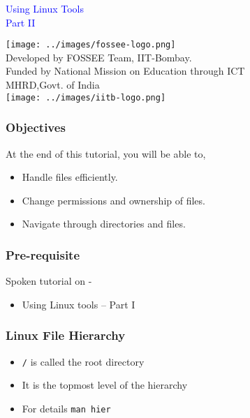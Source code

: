 \documentclass[12pt,compress]{beamer}
\begin{document}
\begin{frame}

\begin{center}
\vspace{12pt}
\textcolor{blue}{\huge Using Linux Tools\\Part II}
\end{center}
\vspace{18pt}
\begin{center}
\vspace{10pt}
\texttt{[image: ../images/fossee-logo.png]}\\
\vspace{5pt}
\scriptsize Developed by FOSSEE Team, IIT-Bombay. \\ 
\scriptsize Funded by National Mission on Education through ICT\\
\scriptsize  MHRD,Govt. of India\\
\texttt{[image: ../images/iitb-logo.png]}\\
\end{center}
\end{frame}
\begin{frame}
\frametitle{Objectives}
\label{sec-2}

At the end of this tutorial, you will be able to,
\begin{itemize}
\item Handle files efficiently.
\item Change permissions and ownership of files.
\item Navigate through directories and files.
\end{itemize}
\end{frame}

\begin{frame}
\frametitle{Pre-requisite}
\label{sec-3}

Spoken tutorial on -
\begin{itemize}
\item Using Linux tools -- Part I
\end{itemize}
\end{frame}


\begin{frame}
  \frametitle{Linux File Hierarchy}
  \begin{itemize}
  \item \texttt{/} is called the root directory
  \item It is the topmost level of the hierarchy
  \item For details \texttt{man hier}
  \end{itemize}
\end{frame}
\end{document}
